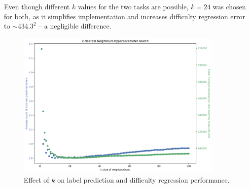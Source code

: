 Even though different $k$ values for the two tasks are possible, $k=24$ was
chosen for both, as it simplifies implementation and increases difficulty
regression error to $\sim\!434.3^2$ -- a negligible difference. 

\begin{figure}[H]
  \centering
  \includegraphics[width=0.9\textwidth]{project/img/knn.png}
  \caption{Effect of $k$ on label prediction and difficulty regression performance.}
  \label{knn}
\end{figure}

